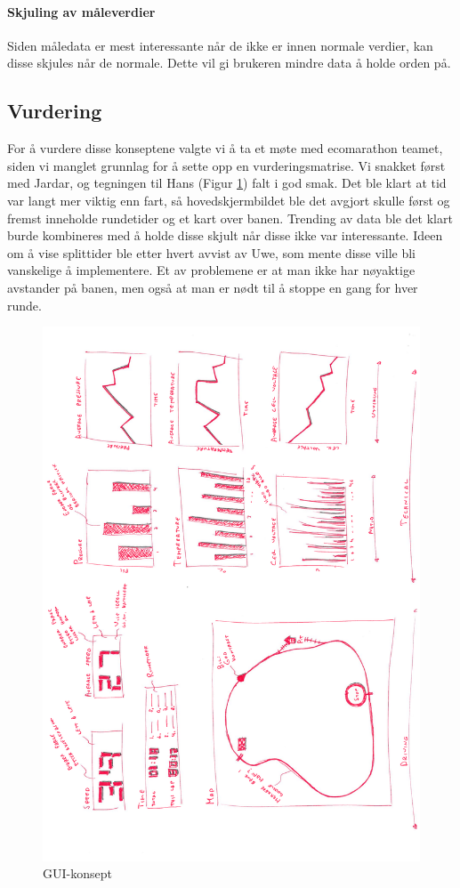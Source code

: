 \paragraph{Skjuling av måleverdier}
Siden måledata er mest interessante når de ikke er innen normale verdier, kan disse skjules når de normale.
Dette vil gi brukeren mindre data å holde orden på.

\subsection{Vurdering}
For å vurdere disse konseptene valgte vi å ta et møte med ecomarathon teamet, siden vi manglet grunnlag for å sette opp en vurderingsmatrise. 
Vi snakket først med Jardar, og tegningen til Hans (Figur \ref{gui-concept}) falt i god smak. 
Det ble klart at tid var langt mer viktig enn fart, så hovedskjermbildet ble det avgjort skulle først og fremst inneholde rundetider og et kart over banen. 
Trending av data ble det klart burde kombineres med å holde disse skjult når disse ikke var interessante.
Ideen om å vise splittider ble etter hvert avvist av Uwe, som mente disse ville bli vanskelige å implementere. 
Et av problemene er at man ikke har nøyaktige avstander på banen, men også at man er nødt til å stoppe en gang for hver runde.

\begin{figure}[H]
\caption{GUI-konsept} 
\label{gui-concept}
\includegraphics[width=\textwidth]{images/gui_concept_hans.pdf}
\end{figure}
